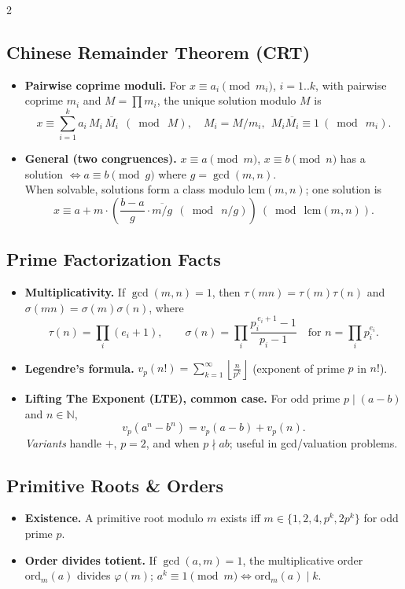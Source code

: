 \documentclass[10pt]{article}
\theoremstyle{definition}
\begin{document}
\begin{multicols*}{2}
\subsection{Chinese Remainder Theorem (CRT)}
\begin{itemize}
  \item \textbf{Pairwise coprime moduli.} For $x\equiv a_i\pmod{m_i}$, $i=1..k$, with pairwise coprime $m_i$ and $M=\prod m_i$, the unique solution modulo $M$ is
  \[
    x \equiv \sum_{i=1}^k a_i\,M_i\,\overline{M_i}\ \ (\bmod\ M),\quad M_i=M/m_i,\ \ M_i\overline{M_i}\equiv 1\ (\bmod\ m_i).
  \]
  \item \textbf{General (two congruences).} $x\equiv a\pmod m$, $x\equiv b\pmod n$ has a solution $\iff a\equiv b\pmod{g}$ where $g=\gcd(m,n)$. \\
        When solvable, solutions form a class modulo $\mathrm{lcm}(m,n)$; one solution is
  \[
    x \equiv a + m\cdot \left( \frac{b-a}{g}\cdot \overline{m/g} \ \ (\bmod\ n/g) \right)\ (\bmod\ \mathrm{lcm}(m,n)).
  \]
\end{itemize}

\subsection{Prime Factorization Facts}
\begin{itemize}
  \item \textbf{Multiplicativity.} If $\gcd(m,n)=1$, then $\tau(mn)=\tau(m)\tau(n)$ and $\sigma(mn)=\sigma(m)\sigma(n)$, where
  \[
    \tau(n)=\prod_{i}(e_i+1),\qquad
    \sigma(n)=\prod_{i}\frac{p_i^{\,e_i+1}-1}{p_i-1}\quad\text{for } n=\prod_i p_i^{e_i}.
  \]
  \item \textbf{Legendre's formula.} $v_p(n!)=\displaystyle\sum_{k=1}^{\infty}\left\lfloor \frac{n}{p^k}\right\rfloor$ (exponent of prime $p$ in $n!$).
  \item \textbf{Lifting The Exponent (LTE), common case.} For odd prime $p\mid (a-b)$ and $n\in\mathbb{N}$,
  \[
    v_p(a^n-b^n)=v_p(a-b)+v_p(n).
  \]
  \emph{Variants} handle $+$, $p=2$, and when $p\nmid ab$; useful in gcd/valuation problems.
\end{itemize}

\subsection{Primitive Roots \& Orders}
\begin{itemize}
  \item \textbf{Existence.} A primitive root modulo $m$ exists iff $m\in\{1,2,4,p^k,2p^k\}$ for odd prime $p$.
  \item \textbf{Order divides totient.} If $\gcd(a,m)=1$, the multiplicative order $\mathrm{ord}_m(a)$ divides $\varphi(m)$; $a^k\equiv 1\pmod m \iff \mathrm{ord}_m(a)\mid k$.
\end{itemize}


\end{multicols*}
\end{document}
